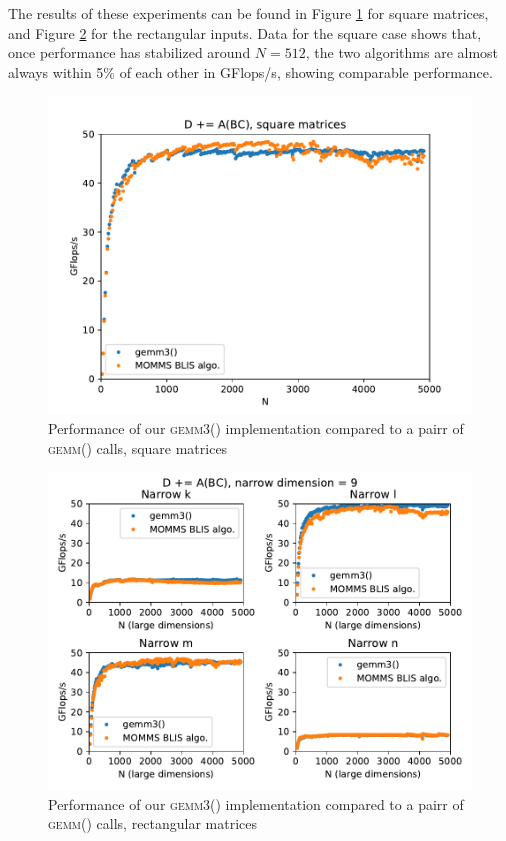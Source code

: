 \documentclass[12pt]{article}
\newcommand*{\gemmt}{{\textsc{gemm3()}}}
\newcommand*{\gemm}{{\textsc{gemm()}}}
\begin{document}
The results of these experiments can be found in Figure \ref{fig:bc_square} for square matrices, and Figure \ref{fig:bc_rectangles} for the rectangular inputs.
Data for the square case shows that, once performance has stabilized around $N = 512$, the two algorithms are almost always within 5\% of each other in GFlops/s, showing comparable performance.
\begin{figure}
  \centering
  \includegraphics[height=0.45\textheight]{../results/earwig2/gemm3}
  \caption{Performance of our \gemmt{} implementation compared to a pairr of \gemm{} calls, square matrices}
  \label{fig:bc_square}
\end{figure}

\begin{figure}
  \centering
  \includegraphics[height=0.45\textheight]{../results/earwig2/gemm3_rectangles}
  \caption{Performance of our \gemmt{} implementation compared to a pairr of \gemm{} calls, rectangular matrices}
  \label{fig:bc_rectangles}
\end{figure}
\end{document}
